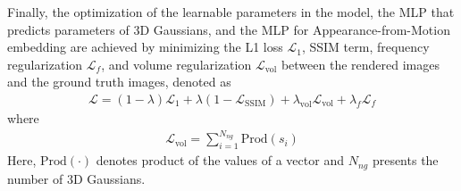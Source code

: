 Finally, the optimization of the learnable parameters in the model, the MLP that predicts parameters of 3D Gaussians, and the MLP for Appearance-from-Motion embedding are achieved by minimizing the L1 loss $\mathcal{L}_1$, SSIM term, frequency regularization $\mathcal{L}_{f}$, and volume regularization $\mathcal{L}_{\text{vol}}$ between the rendered images and the ground truth images, denoted as
\begin{align}
\mathcal{L} = (1-\lambda)\mathcal{L}_1 +  \lambda(1-\mathcal{L}_{\text{SSIM}}) +\lambda_{\text{vol}}\mathcal{L}_{\text{vol}} + \lambda_{f} \mathcal{L}_{f}
\end{align}
where 
\begin{align}
\mathcal{L}_{\text{vol}} =\sum_{i=1}^{N_{ng}}\text{Prod}(s_i)
\end{align}
Here, $\text{Prod}(\cdot)$ denotes product of the values of a vector and $N_{ng}$ presents the number of 3D Gaussians.


